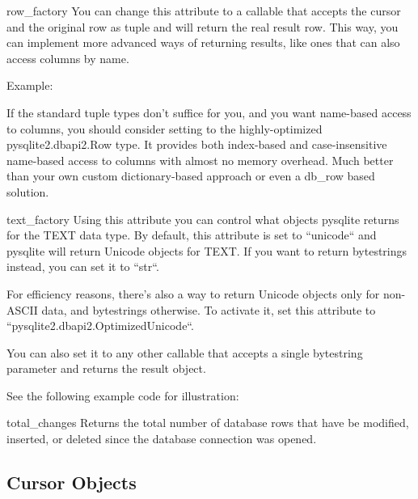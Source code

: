 \begin{memberdesc}{row_factory}
  You can change this attribute to a callable that accepts the cursor and
  the original row as tuple and will return the real result row.  This
  way, you can implement more advanced ways of returning results, like
  ones that can also access columns by name.

  Example:

  

  If the standard tuple types don't suffice for you, and you want name-based
  access to columns, you should consider setting  to the
  highly-optimized pysqlite2.dbapi2.Row type. It provides both
  index-based and case-insensitive name-based access to columns with almost
  no memory overhead. Much better than your own custom dictionary-based
  approach or even a db_row based solution.
\end{memberdesc}

\begin{memberdesc}{text_factory}
  Using this attribute you can control what objects pysqlite returns for the
  TEXT data type. By default, this attribute is set to ``unicode`` and
  pysqlite will return Unicode objects for TEXT. If you want to return
  bytestrings instead, you can set it to ``str``.

  For efficiency reasons, there's also a way to return Unicode objects only
  for non-ASCII data, and bytestrings otherwise. To activate it, set this
  attribute to ``pysqlite2.dbapi2.OptimizedUnicode``.

  You can also set it to any other callable that accepts a single bytestring
  parameter and returns the result object.

  See the following example code for illustration:

  
\end{memberdesc}

\begin{memberdesc}{total_changes}
  Returns the total number of database rows that have be modified, inserted,
  or deleted since the database connection was opened.
\end{memberdesc}





\subsection{Cursor Objects \label{Cursor-Objects}}

